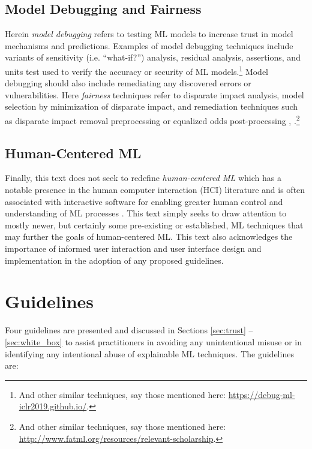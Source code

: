 \documentclass[fleqn]{article}
\begin{document}
\subsection{Model Debugging and Fairness}

Herein \textit{model debugging} refers to testing ML models to increase trust in model mechanisms and predictions. Examples of model debugging techniques include variants of sensitivity (i.e. ``what-if?'') analysis, residual analysis, assertions, and units test used to verify the accuracy or security of ML models.\footnote{And other similar techniques, say those mentioned here: \url{https://debug-ml-iclr2019.github.io/}.} Model debugging should also include remediating any discovered errors or vulnerabilities. Here \textit{fairness} techniques refer to disparate impact analysis, model selection by minimization of disparate impact, and remediation techniques such as disparate impact removal preprocessing or equalized odds post-processing \cite{feldman2015certifying}, \cite{hardt2016equality}.\footnote{And other similar techniques, say those mentioned here: \url{http://www.fatml.org/resources/relevant-scholarship}.} 

\subsection{Human-Centered ML}

Finally, this text does not seek to redefine \textit{human-centered ML} which has a notable presence in the human computer interaction (HCI) literature and is often associated with interactive software for enabling greater human control and understanding of ML processes \cite{hcml}. This text simply seeks to draw attention to mostly newer, but certainly some pre-existing or established, ML techniques that may further the goals of human-centered ML. This text also acknowledges the importance of informed user interaction and user interface design and implementation in the adoption of any proposed guidelines.

\section{Guidelines}

Four guidelines are presented and discussed in Sections \ref{sec:trust} -- \ref{sec:white_box} to assist practitioners in avoiding any unintentional misuse or in identifying any intentional abuse of explainable ML techniques. The guidelines are: 
\end{document}

